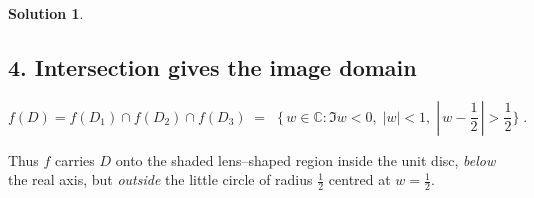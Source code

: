 \documentclass[12pt]{article}
\theoremstyle{definition} %
\newtheorem{solution}{Solution}
\theoremstyle{plain} %
\begin{document}
\begin{solution}
   \subsection*{4.  Intersection gives the image domain}
   \[
     f(D)
     =f(D_{1})\cap f(D_{2})\cap f(D_{3})
     \;=\;
     \boxed{\;
       \bigl\{\,w\in\mathbb{C} :
          \Im w<0,\;
          |w|<1,\;
          |\,w-\frac12\,|>\frac12
       \bigr\}
     \;}.
   \]
   
   \vspace{0.5em}
   Thus \(f\) carries \(D\) onto the shaded lens--shaped region inside the 
   unit disc, \emph{below} the real axis, but \emph{outside} the little circle 
   of radius \(\tfrac12\) centred at \(w=\tfrac12\).
   \end{solution}
\end{document}
